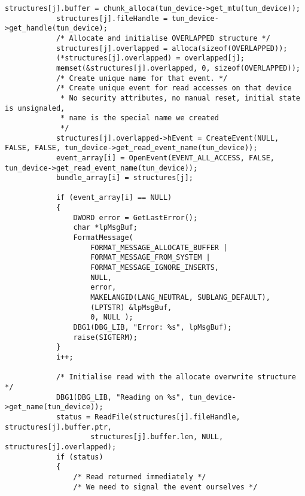 \begin{lstlisting}[caption=Code für handle\_plain auf Windows]
            structures[j].buffer = chunk_alloca(tun_device->get_mtu(tun_device));
            structures[j].fileHandle = tun_device->get_handle(tun_device);
            /* Allocate and initialise OVERLAPPED structure */
            structures[j].overlapped = alloca(sizeof(OVERLAPPED));
            (*structures[j].overlapped) = overlapped[j];
            memset(&structures[j].overlapped, 0, sizeof(OVERLAPPED));
            /* Create unique name for that event. */
            /* Create unique event for read accesses on that device
             * No security attributes, no manual reset, initial state is unsignaled,
             * name is the special name we created
             */
            structures[j].overlapped->hEvent = CreateEvent(NULL, FALSE, FALSE, tun_device->get_read_event_name(tun_device));
            event_array[i] = OpenEvent(EVENT_ALL_ACCESS, FALSE, tun_device->get_read_event_name(tun_device));
            bundle_array[i] = structures[j];

            if (event_array[i] == NULL)
            {
                DWORD error = GetLastError();
                char *lpMsgBuf;
                FormatMessage(
                    FORMAT_MESSAGE_ALLOCATE_BUFFER |
                    FORMAT_MESSAGE_FROM_SYSTEM |
                    FORMAT_MESSAGE_IGNORE_INSERTS,
                    NULL,
                    error,
                    MAKELANGID(LANG_NEUTRAL, SUBLANG_DEFAULT),
                    (LPTSTR) &lpMsgBuf,
                    0, NULL );
                DBG1(DBG_LIB, "Error: %s", lpMsgBuf);
                raise(SIGTERM);
            }
            i++;

            /* Initialise read with the allocate overwrite structure */
            DBG1(DBG_LIB, "Reading on %s", tun_device->get_name(tun_device));
            status = ReadFile(structures[j].fileHandle, structures[j].buffer.ptr,
                    structures[j].buffer.len, NULL, structures[j].overlapped);
            if (status)
            {
                /* Read returned immediately */
                /* We need to signal the event ourselves */


\end{lstlisting}
